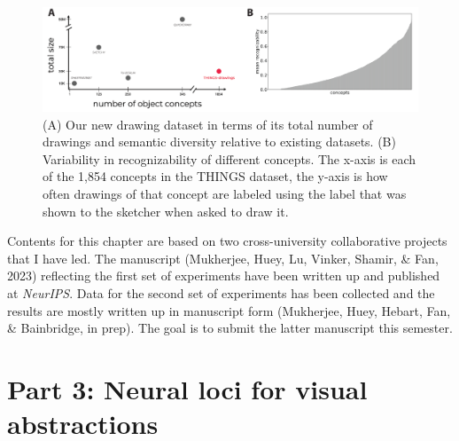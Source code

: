 \documentclass{Dissertate}
\begin{document}
\begin{figure}[htpb!]
    \centering
    \includegraphics[width=.8\linewidth]{proposal/figures/chap4b.pdf}
    \caption{(A) Our new drawing dataset in terms of its total number of drawings and semantic diversity relative to existing datasets. (B) Variability in recognizability of different concepts. The x-axis is each of the 1,854 concepts in the THINGS dataset, the y-axis is how often drawings of that concept are labeled using the label that was shown to the sketcher when asked to draw it.}
    \label{fig:chap4b}
\end{figure}



\begin{tcolorbox}[
    colback=gray!10,  %
    colframe=black!50, %
    arc=4mm,         %
    boxrule=2pt      %
]
Contents for this chapter are based on two cross-university collaborative projects that I have led. 
The manuscript (Mukherjee, Huey, Lu, Vinker, Shamir, \& Fan, 2023) reflecting the first set of experiments have been written up and published at \textit{NeurIPS}.
Data for the second set of experiments has been collected and the results are mostly written up in manuscript form (Mukherjee, Huey, Hebart, Fan, \& Bainbridge, in prep).
The goal is to submit the latter manuscript this semester.
\end{tcolorbox}



\section*{\textbf{Part 3: Neural loci for visual abstractions}}
\end{document}
